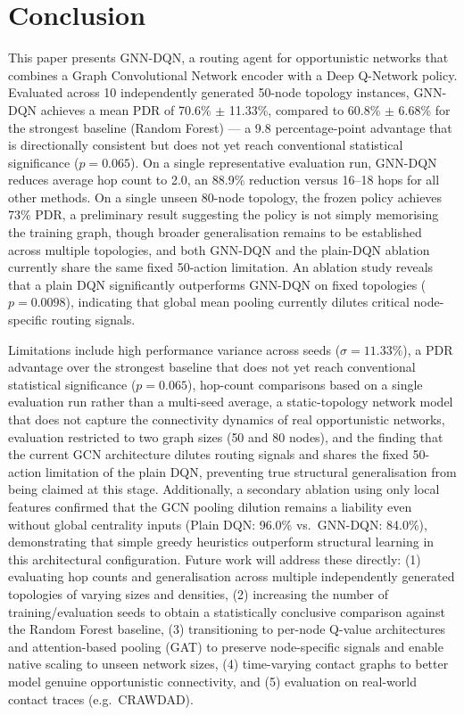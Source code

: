 \documentclass[conference]{IEEEtran}
\begin{document}
\section{Conclusion}
This paper presents GNN-DQN, a routing agent for opportunistic
networks that combines a Graph Convolutional Network encoder
with a Deep Q-Network policy. Evaluated across 10 independently
generated 50-node topology instances, GNN-DQN achieves a mean PDR
of 70.6\% $\pm$ 11.33\%, compared to 60.8\% $\pm$ 6.68\% for the
strongest baseline (Random Forest) — a 9.8 percentage-point
advantage that is directionally consistent but does not yet reach
conventional statistical significance ($p=0.065$). On a single
representative evaluation run, GNN-DQN reduces average hop count
to 2.0, an 88.9\% reduction versus 16--18 hops for all other
methods. On a single unseen 80-node topology, the frozen policy
achieves 73\% PDR, a preliminary result suggesting the policy is
not simply memorising the training graph, though broader
generalisation remains to be established across multiple
topologies, and both GNN-DQN and the plain-DQN ablation currently
share the same fixed 50-action limitation. An ablation study
reveals that a plain DQN significantly outperforms GNN-DQN on
fixed topologies ($p=0.0098$), indicating that global mean pooling
currently dilutes critical node-specific routing signals.

Limitations include high performance variance across seeds
($\sigma = 11.33\%$), a PDR advantage over the strongest baseline
that does not yet reach conventional statistical significance
($p = 0.065$), hop-count comparisons based on a single evaluation
run rather than a multi-seed average, a static-topology network
model that does not capture the connectivity dynamics of real
opportunistic networks, evaluation restricted to two graph
sizes (50 and 80 nodes), and the finding that the current GCN
architecture dilutes routing signals and shares the fixed
50-action limitation of the plain DQN, preventing true structural
generalisation from being claimed at this stage. Additionally, a
secondary ablation using only local features confirmed that the
GCN pooling dilution remains a liability even without global
centrality inputs (Plain DQN: 96.0\% vs.\ GNN-DQN: 84.0\%),
demonstrating that simple greedy heuristics outperform structural
learning in this architectural configuration. Future work will
address these directly: (1) evaluating hop counts and
generalisation across multiple independently generated topologies
of varying sizes and densities, (2) increasing the number of
training/evaluation seeds to obtain a statistically conclusive
comparison against the Random Forest baseline, (3) transitioning
to per-node Q-value architectures and attention-based pooling
(GAT) to preserve node-specific signals and enable native scaling
to unseen network sizes, (4) time-varying contact graphs to better
model genuine opportunistic connectivity, and (5) evaluation on
real-world contact traces (e.g.\ CRAWDAD).
\end{document}
